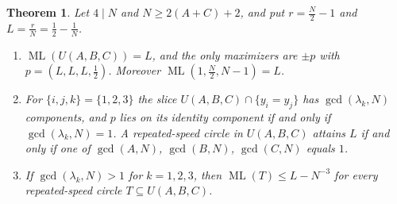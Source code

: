 \documentclass[12pt]{amsart}
\newtheorem{theorem}{Theorem}[section]
\theoremstyle{definition}\newtheorem{definition}[theorem]{Definition}
\theoremstyle{remark}\newtheorem{remark}[theorem]{Remark}
\newcommand{\ML}{\operatorname{ML}}
\begin{document}
\begin{theorem}\label{thm:obstr}
Let $4\mid N$ and $N\ge2(A+C)+2$, and put $r=\frac N2-1$ and $L=\frac rN=\frac12-\frac1N$.
\begin{enumerate}[label=\textup{(\roman*)},leftmargin=*]
\item $\ML(U(A,B,C))=L$, and the only maximizers are $\pm p$ with $p=(L,L,L,\frac12)$. Moreover $\ML(1,\frac N2,N-1)=L$.
\item For $\{i,j,k\}=\{1,2,3\}$ the slice $U(A,B,C)\cap\{y_i=y_j\}$ has $\gcd(\lambda_k,N)$ components, and $p$ lies on its identity component if and only if $\gcd(\lambda_k,N)=1$. A repeated-speed circle in $U(A,B,C)$ attains $L$ if and only if one of $\gcd(A,N)$, $\gcd(B,N)$, $\gcd(C,N)$ equals $1$.
\item If $\gcd(\lambda_k,N)>1$ for $k=1,2,3$, then $\ML(T)\le L-N^{-3}$ for every repeated-speed circle $T\subseteq U(A,B,C)$.
\end{enumerate}
\end{theorem}
\end{document}

